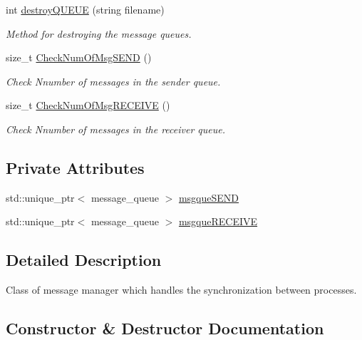\begin{DoxyCompactItemize}
int \hyperlink{classmessage__manager_ad6d2784240bffb39dc7e2dae9d6b0751}{destroy\+Q\+U\+E\+UE} (string filename)
\begin{DoxyCompactList}\small\item\em Method for destroying the message queues. \end{DoxyCompactList}\item 
size\+\_\+t \hyperlink{classmessage__manager_a83ad668e1cd4566d4d7936ed16e41c83}{Check\+Num\+Of\+Msg\+S\+E\+ND} ()
\begin{DoxyCompactList}\small\item\em Check Nnumber of messages in the sender queue. \end{DoxyCompactList}\item 
size\+\_\+t \hyperlink{classmessage__manager_a4bcbca2647a5bd5fa34fc01b36a9761a}{Check\+Num\+Of\+Msg\+R\+E\+C\+E\+I\+VE} ()
\begin{DoxyCompactList}\small\item\em Check Nnumber of messages in the receiver queue. \end{DoxyCompactList}\end{DoxyCompactItemize}
\subsection*{Private Attributes}
\begin{DoxyCompactItemize}
\item 
std\+::unique\+\_\+ptr$<$ message\+\_\+queue $>$ \hyperlink{classmessage__manager_a587e012eba883e294532f4d28bd54a47}{msgque\+S\+E\+ND}
\item 
std\+::unique\+\_\+ptr$<$ message\+\_\+queue $>$ \hyperlink{classmessage__manager_a02b3ec0e7e4003a7f8483382e0b9d813}{msgque\+R\+E\+C\+E\+I\+VE}
\end{DoxyCompactItemize}


\subsection{Detailed Description}
Class of message manager which handles the synchronization between processes. 

\subsection{Constructor \& Destructor Documentation}
\mbox{\label{classmessage__manager_a9db91d8dc6020a4bb525abc218fe09ae}} 
